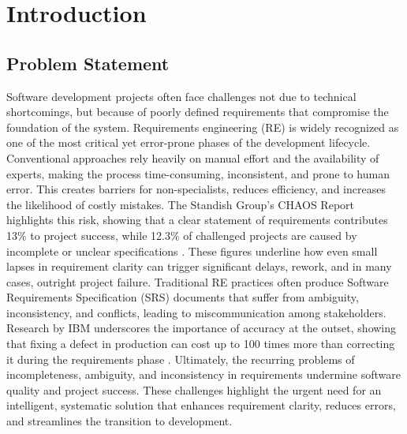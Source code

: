 \chapter{Introduction}
\label{sec:introduction}
\section{Problem Statement}
\vspace{-0.5cm} 
Software development projects often face challenges not due to technical shortcomings, but because of poorly defined requirements that compromise the foundation of the system. Requirements engineering (RE) is widely recognized as one of the most critical yet error-prone phases of the development lifecycle. Conventional approaches rely heavily on manual effort and the availability of experts, making the process time-consuming, inconsistent, and prone to human error. This creates barriers for non-specialists, reduces efficiency, and increases the likelihood of costly mistakes.
The Standish Group’s CHAOS Report highlights this risk, showing that a clear statement of requirements contributes 13\% to project success, while 12.3\% of challenged projects are caused by incomplete or unclear specifications \cite{1}. These figures underline how even small lapses in requirement clarity can trigger significant delays, rework, and in many cases, outright project failure. Traditional RE practices often produce Software Requirements Specification (SRS) documents that suffer from ambiguity, inconsistency, and conflicts, leading to miscommunication among stakeholders.
Research by IBM underscores the importance of accuracy at the outset, showing that fixing a defect in production can cost up to 100 times more than correcting it during the requirements phase \cite{2}.
Ultimately, the recurring problems of incompleteness, ambiguity, and inconsistency in requirements undermine software quality and project success. These challenges highlight the urgent need for an intelligent, systematic solution that enhances requirement clarity, reduces errors, and streamlines the transition to development.

